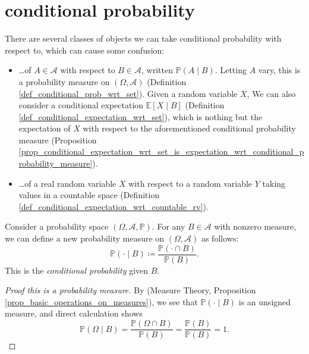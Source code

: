 \documentclass[12pt]{article}
\begin{document}

\section{conditional probability} %

There are several classes of objects we can take conditional probability with respect to, which can cause some confusion:
\begin{itemize}
	\item \dots of $A\in\mathcal{A}$ with respect to $B\in\mathcal{A}$, written $\mathbb{P}(A\mid B)$. Letting $A$ vary, this is a probability measure on $(\Omega,\mathcal{A})$ (Definition \ref{def_conditional_prob_wrt_set}). Given a random variable $X$, We can also consider a conditional expectation $\mathbb{E}[X\mid B]$ (Definition \ref{def_conditional_expectation_wrt_set}), which is nothing but the expectation of $X$ with respect to the aforementioned conditional probability measure (Proposition \ref{prop_conditional_expectation_wrt_set_is_expectation_wrt_conditional_probability_measure}).
	\item \dots of a real random variable $X$ with respect to a random variable $Y$ taking values in a countable space (Definition \ref{def_conditional_expectation_wrt_countable_rv}). 
\end{itemize}

\begin{definition} %
\label{def_conditional_prob_wrt_set}
	Consider a probability space $(\Omega,\mathcal{A},\mathbb{P})$. For any $B\in\mathcal{A}$ with nonzero measure, we can define a new probability measure on $(\Omega,\mathcal{A})$ as follows: 
	\begin{equation*}
		\mathbb{P}(\cdot \mid B) \coloneqq \frac{\mathbb{P}(\cdot \cap B)}{\mathbb{P}(B)}.
	\end{equation*}
	This is the \emph{conditional probability} given $B$.
\end{definition}
\begin{proof}[Proof this is a probability measure]
	By (Measure Theory, Proposition \ref{prop_basic_operations_on_measures}), we see that $\mathbb{P}(\cdot \mid B)$ is an unsigned measure, and direct calculation shows
	\begin{equation*}
		\mathbb{P}(\Omega \mid B) = \frac{\mathbb{P} (\Omega \cap B)}{\mathbb{P}(B)} = \frac{\mathbb{P}(B)}{\mathbb{P}(B)} = 1.
	\end{equation*}
\end{proof}
\end{document}
